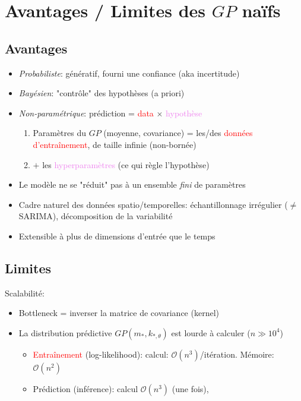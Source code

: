 \documentclass[xcolor=svgnames, t]{beamer}
\newcommand{\coloredemph}[1]{\textcolor{internationalblue}{\emph{#1}}}
\newcommand{\tored}[1]{\textcolor{red}{#1}}
\newcommand{\toblue}[1]{\textcolor{internationalblue}{#1}}
\newcommand{\topurple}[1]{\textcolor{violet}{#1}}
\begin{document}
\section{Avantages / Limites des $GP$ naïfs}

\subsection{Avantages}
\begin{frame}{\subsecname}
  \begin{itemize}
    \item \coloredemph{Probabiliste}: génératif, fourni une confiance (aka incertitude)
    \pause
    \item \coloredemph{Bayésien}: "contrôle" des hypothèses (a priori)
    \pause
    \item \coloredemph{Non-paramétrique}: \toblue{prédiction} = \tored{data} $\times$ \topurple{hypothèse}
      \begin{enumerate}
        \item Paramètres du $GP$ (moyenne, covariance) = les/des \tored{données d'entraînement}, de taille infinie (non-bornée)
        \pause
        \item $+$ les \topurple{hyperparamètres} (ce qui règle l'hypothèse)
      \end{enumerate}
    \pause
    \item Le modèle ne se "réduit" pas à un ensemble \coloredemph{fini} de paramètres
    \pause
    \item Cadre naturel des données spatio/temporelles: échantillonnage irrégulier ($\neq$ SARIMA), décomposition de la variabilité
    \pause
    \item Extensible à plus de dimensions d'entrée que le temps
  \end{itemize}
\end{frame}

\subsection{Limites}
\begin{frame}{\subsecname}
  Scalabilité:
  \begin{itemize}
    \item Bottleneck = inverser la matrice de covariance (kernel)
    \item La distribution prédictive $GP( m_{*}, k_{*, \theta} )$ est lourde à calculer ($n \gg 10^4$)
      \begin{itemize}
        \item \tored{Entraînement} (log-likelihood): calcul: $\mathcal{O}(n^3)$/itération. Mémoire: $\mathcal{O}(n^2)$
        \item \toblue{Prédiction} (inférence): calcul $\mathcal{O}(n^3)$ (une fois), 
      \end{itemize}
  \end{itemize}
\end{frame}
\end{document}
